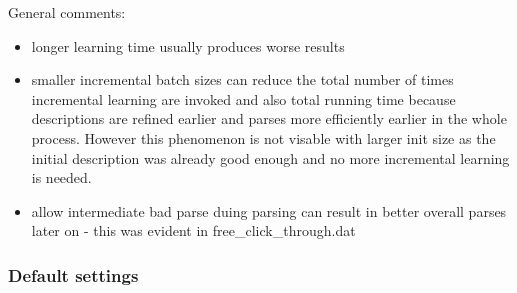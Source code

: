General comments: 
\begin{itemize}
\item longer learning time usually produces worse results
\item smaller incremental batch sizes can reduce the total number of times 
incremental learning are invoked  and also total running time
because descriptions are refined earlier and parses more efficiently earlier
in the whole process. However this phenomenon is not visable with larger
init size as the initial description was already good enough and no more 
incremental learning is needed.
\item allow intermediate bad parse duing parsing can result in better overall 
parses later on - this was evident in free\_click\_through.dat
\end{itemize}

\subsubsection{Default settings}

